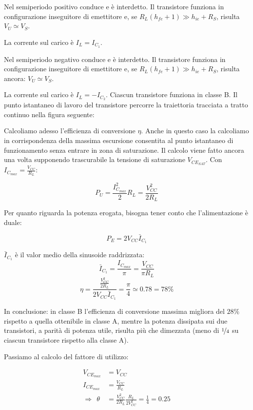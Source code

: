 Nel semiperiodo positivo conduce  e  è interdetto. Il transistore  funziona in configurazione inseguitore di emettitore e, se $R_L (h_{fe} +1 ) \gg h_{ie} + R_S$, risulta $V_U \simeq V_S$.

La corrente sul carico è $I_L = I_{C_1}$.

Nel semiperiodo negativo  conduce e  è interdetto. Il transistore  funziona in configurazione inseguitore di emettitore e, se $R_L (h_{fe} +1) \gg h_{ie} + R_S$, risulta ancora:
$V_U \simeq V_S$.

La corrente sul carico è $I_L = -I_{C_2}$.
Ciascun transistore funziona in classe B.
Il punto istantaneo di lavoro del transistore  percorre la traiettoria tracciata a tratto continuo nella
figura seguente:

Calcoliamo adesso l'efficienza di conversione $\eta$. Anche in questo caso la calcoliamo in corrispondenza della massima escursione consentita al punto istantaneo di funzionamento senza entrare in zona di saturazione. Il calcolo viene fatto ancora una volta supponendo trascurabile la tensione di saturazione $V_{CE_{SAT}}$. Con $I_{C_{max}} = \frac{V_{CC}}{R_L} $:

\[P_U = \frac{I_{C_{max}}^2}{2}R_L = \frac{V_{CC}^2}{2R_L}\]

Per quanto riguarda la potenza erogata, bisogna tener conto che l'alimentazione è duale:

\[P_E = 2 V_{CC} \bar{I}_{C_1}\]

$\bar{I}_{C_1}$ è il valor medio della sinusoide raddrizzata:
\[\bar{I}_{C_1} = \frac{I_{C_{max}}}{\pi} = \frac{V_{CC}}{\pi R_L}\]
\[ \eta = \frac{\frac{V_{CC}^2}{2R_L}}{2 V_{CC} \bar{I}_{C_1}}  = \frac{\pi}{4} \simeq 0.78 = 78 \% \]

In conclusione: in classe B l'efficienza di conversione massima migliora del $28\%$ rispetto a quella
ottenibile in classe A, mentre la potenza dissipata sui due transistori, a parità di potenza utile,
risulta più che dimezzata (meno di $\nicefrac{1}{4}$ su ciascun transistore rispetto alla classe A).

Passiamo al calcolo del fattore di utilizzo:

\[\begin{aligned}
V_{CE_{max}} & = V_{CC}\\
I_{CE_{max}} & = \frac{V_{CC}}{R_L}\\
\Rightarrow ~~ \theta & = \frac{V_{CC}^2}{2 R_L} \frac{R_L}{2 V_{CC}^2} = \frac{1}{4} = 0.25
\end{aligned}\]

